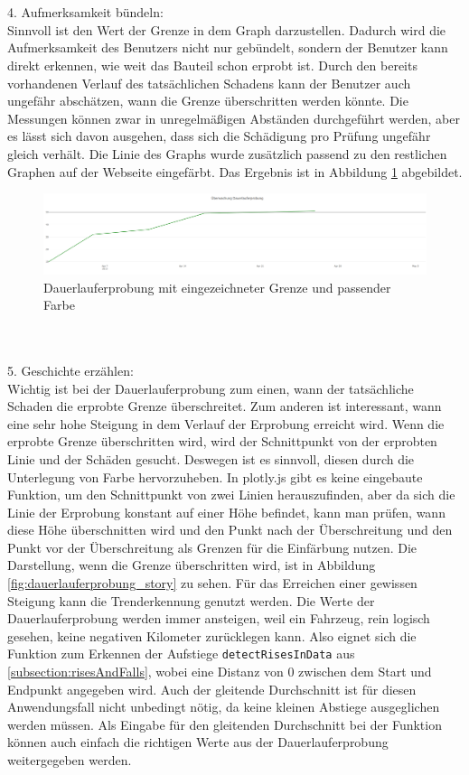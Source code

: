 \\\\
 4. Aufmerksamkeit bündeln:\\
Sinnvoll ist den Wert der Grenze in dem Graph darzustellen. Dadurch wird die Aufmerksamkeit des Benutzers nicht nur gebündelt, sondern der Benutzer kann direkt erkennen, wie weit das Bauteil schon erprobt ist. Durch den bereits vorhandenen Verlauf des tatsächlichen Schadens kann der Benutzer auch ungefähr abschätzen, wann die Grenze überschritten werden könnte. Die Messungen können zwar in unregelmäßigen Abständen durchgeführt werden, aber es lässt sich davon ausgehen, dass sich die Schädigung pro Prüfung ungefähr gleich verhält. Die Linie des Graphs wurde zusätzlich passend zu den restlichen Graphen auf der Webseite eingefärbt. Das Ergebnis ist in Abbildung \ref{fig:dauerlauferprobung_aufmerksamkeit} abgebildet.
\begin{figure}[!h]
    \centering
    \includegraphics[width=1\linewidth]{gfx/dauerlauferprobung_aufmerksamkeit.png}
    \caption{Dauerlauferprobung mit eingezeichneter Grenze und passender Farbe}
    \label{fig:dauerlauferprobung_aufmerksamkeit}
\end{figure}
\\\\
 5. Geschichte erzählen:\\
Wichtig ist bei der Dauerlauferprobung zum einen, wann der tatsächliche Schaden die erprobte Grenze überschreitet. Zum anderen ist interessant, wann eine sehr hohe Steigung in dem Verlauf der Erprobung erreicht wird. Wenn die erprobte Grenze überschritten wird, wird der Schnittpunkt von der erprobten Linie und der Schäden gesucht. Deswegen ist es sinnvoll, diesen durch die Unterlegung von Farbe hervorzuheben. In plotly.js gibt es keine eingebaute Funktion, um den Schnittpunkt von zwei Linien herauszufinden, aber da sich die Linie der Erprobung konstant auf einer Höhe befindet, kann man prüfen, wann diese Höhe überschnitten wird und den Punkt nach der Überschreitung und den Punkt vor der Überschreitung als Grenzen für die Einfärbung nutzen. Die Darstellung, wenn die Grenze überschritten wird, ist in Abbildung \ref{fig:dauerlauferprobung_story} zu sehen. Für das Erreichen einer gewissen Steigung kann die Trenderkennung genutzt werden. Die Werte der Dauerlauferprobung werden immer ansteigen, weil ein Fahrzeug, rein logisch gesehen, keine negativen Kilometer zurücklegen kann. Also eignet sich die Funktion zum Erkennen der Aufstiege \texttt{detectRisesInData} aus \ref{subsection:risesAndFalls}, wobei eine Distanz von 0 zwischen dem Start und Endpunkt angegeben wird. Auch der gleitende Durchschnitt ist für diesen Anwendungsfall nicht unbedingt nötig, da keine kleinen Abstiege ausgeglichen werden müssen. Als Eingabe für den gleitenden Durchschnitt bei der Funktion können auch einfach die richtigen Werte aus der Dauerlauferprobung weitergegeben werden.\\\\
